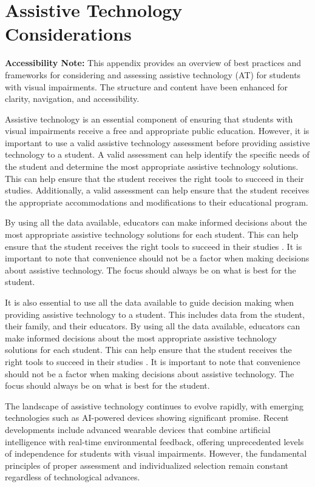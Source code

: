 \chapter{Assistive Technology Considerations}\label{trouble3}

\noindent
\textbf{Accessibility Note:} This appendix provides an overview of best practices and frameworks for considering and assessing assistive technology (AT) for students with visual impairments. The structure and content have been enhanced for clarity, navigation, and accessibility.

Assistive technology is an essential component of ensuring that students with visual impairments receive a free and appropriate public education. However, it is important to use a valid assistive technology assessment before providing assistive technology to a student. A valid assessment can help identify the specific needs of the student and determine the most appropriate assistive technology solutions. This can help ensure that the student receives the right tools to succeed in their studies. Additionally, a valid assessment can help ensure that the student receives the appropriate accommodations and modifications to their educational program.

By using all the data available, educators can make informed decisions about the most appropriate assistive technology solutions for each student. This can help ensure that the student receives the right tools to succeed in their studies  \cite{AEMCenter}. It is important to note that convenience should not be a factor when making decisions about assistive technology. The focus should always be on what is best for the student.

It is also essential to use all the data available to guide decision making when providing assistive technology to a student. This includes data from the student, their family, and their educators. By using all the data available, educators can make informed decisions about the most appropriate assistive technology solutions for each student. This can help ensure that the student receives the right tools to succeed in their studies \cite{AEMCenter}. It is important to note that convenience should not be a factor when making decisions about assistive technology. The focus should always be on what is best for the student.

The landscape of assistive technology continues to evolve rapidly, with emerging technologies such as AI-powered devices showing significant promise. Recent developments include advanced wearable devices that combine artificial intelligence with real-time environmental feedback, offering unprecedented levels of independence for students with visual impairments. However, the fundamental principles of proper assessment and individualized selection remain constant regardless of technological advances.

